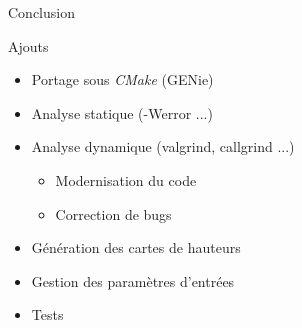 \begin{frame}{Conclusion}

Ajouts

\begin{itemize}
    \item Portage sous \textit{CMake} (GENie)
    \item Analyse statique  (-Werror ...)
    \item Analyse dynamique (valgrind, callgrind ...)
    \begin{itemize}
        \item Modernisation du code
        \item Correction de bugs
    \end{itemize}
    \item Génération des cartes de hauteurs
    \item Gestion des paramètres d'entrées
    \item Tests
\end{itemize}

\end{frame}